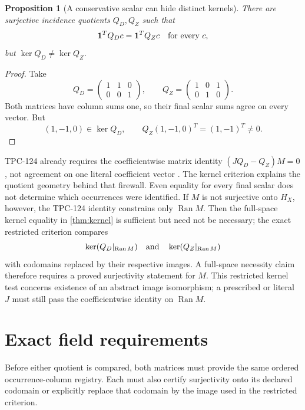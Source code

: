 \documentclass[11pt]{article}
\newtheorem{proposition}[theorem]{Proposition}
\theoremstyle{definition}
\theoremstyle{remark}
\newcommand{\one}{\mathbf 1}
\begin{document}
\begin{proposition}[A conservative scalar can hide distinct kernels]
\label{prop:scalar}
There are surjective incidence quotients \(Q_D,Q_Z\) such that
\[
 \one^TQ_Dc=\one^TQ_Zc
\quad\hbox{for every }c,
\]
but \(\ker Q_D\ne\ker Q_Z\).
\end{proposition}

\begin{proof}
Take
\[
 Q_D=\begin{pmatrix}1&1&0\\0&0&1\end{pmatrix},
 \qquad
 Q_Z=\begin{pmatrix}1&0&1\\0&1&0\end{pmatrix}.
\]
Both matrices have column sums one, so their final scalar sums agree
on every vector.  But
\[
 (1,-1,0)\in\ker Q_D,\qquad
 Q_Z(1,-1,0)^T=(1,-1)^T\ne0.
\]
\end{proof}

TPC-124 already requires the coefficientwise matrix identity
\((JQ_D-Q_Z)M=0\), not agreement on one literal coefficient vector
\citep{WangTPC124}.  The kernel criterion explains the quotient
geometry behind that firewall.  Even equality for every final scalar
does not determine which occurrences were identified.  If \(M\) is
not surjective onto \(H_X\), however, the TPC-124 identity constrains
only \(\operatorname{Ran}M\).  Then the full-space kernel equality in
\cref{thm:kernel} is sufficient but need not be necessary; the exact
restricted criterion compares
\[
 \ker(Q_D|_{\operatorname{Ran}M})
 \quad\hbox{and}\quad
 \ker(Q_Z|_{\operatorname{Ran}M})
\]
with codomains replaced by their respective images.  A full-space
necessity claim therefore requires a proved surjectivity statement
for \(M\).  This restricted kernel test concerns existence of an
abstract image isomorphism; a prescribed or literal \(J\) must still
pass the coefficientwise identity on \(\operatorname{Ran}M\).

\section{Exact field requirements}

Before either quotient is compared, both matrices must provide the
same ordered occurrence-column registry.  Each must also certify
surjectivity onto its declared codomain or explicitly replace that
codomain by the image used in the restricted criterion.
\end{document}
